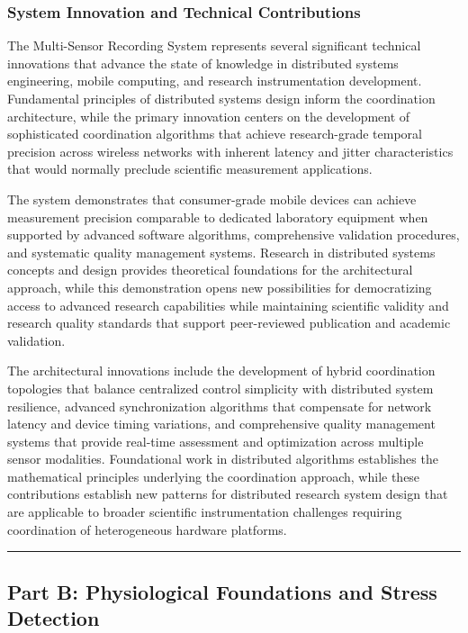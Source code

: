 \documentclass[11pt,a4paper]{article}
\begin{document}
\subsubsection{System Innovation and Technical Contributions}

The Multi-Sensor Recording System represents several significant technical innovations that advance the state of
knowledge in distributed systems engineering, mobile computing, and research instrumentation development. Fundamental
principles of distributed systems design inform the coordination architecture, while the primary innovation centers on
the development of sophisticated coordination algorithms that achieve research-grade temporal precision across wireless
networks with inherent latency and jitter characteristics that would normally preclude scientific measurement
applications.

The system demonstrates that consumer-grade mobile devices can achieve measurement precision comparable to dedicated
laboratory equipment when supported by advanced software algorithms, comprehensive validation procedures, and systematic
quality management systems. Research in distributed systems concepts and design provides theoretical foundations for the
architectural approach, while this demonstration opens new possibilities for democratizing access to advanced research
capabilities while maintaining scientific validity and research quality standards that support peer-reviewed publication
and academic validation.

The architectural innovations include the development of hybrid coordination topologies that balance centralized control
simplicity with distributed system resilience, advanced synchronization algorithms that compensate for network latency
and device timing variations, and comprehensive quality management systems that provide real-time assessment and
optimization across multiple sensor modalities. Foundational work in distributed algorithms establishes the mathematical
principles underlying the coordination approach, while these contributions establish new patterns for distributed
research system design that are applicable to broader scientific instrumentation challenges requiring coordination of
heterogeneous hardware platforms.

\hrule

\subsection{Part B: Physiological Foundations and Stress Detection}
\end{document}
